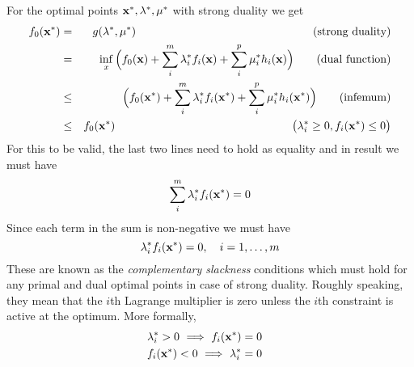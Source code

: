 For the optimal points $\mathbf{x}^*,\mathbf{\lambda}^*,\mathbf{\mu}^*$ with strong duality we get
\begin{eqnarray}
 f_0(\vc{x}^*) 
& = & g(\vc{\lambda}^*,\vc{\mu}^*) \text{\hskip 5.5cm (strong duality)} \nonumber \\
& = & \inf_x \Big( 
  f_0(\vc{x}) + \sum_i^m \lambda_i^* f_i(\vc{x}) + \sum_i^p \mu_i^* h_i(\vc{x})
\Big) \qquad \text{(dual function)} \nonumber \\
& \leq & \Big( 
  f_0(\vc{x}^*) + \sum_i^m \lambda_i^* f_i(\vc{x}^*) + \sum_i^p \mu_i^* h_i(\vc{x}^*)
\Big) \qquad \text{(infemum)} \\
& \leq & f_0(\vc{x}^*) \text{\hskip 5.5cm } \big( \lambda_i^* \geq 0,  f_i(\vc{x}^*) \leq 0 \big) \nonumber
\end{eqnarray}
For this to be valid, the last two lines need to hold as equality and in result we must have
\begin{equation}
 \sum_i^m \lambda_i^* f_i(\mathbf{x}^*) = 0
\end{equation}
Since each term in the sum is non-negative we must have
\begin{equation}\label{eq:ComplementarySlackness}\index{Complementary slackness}
 \lambda_i^* f_i(\vc{x}^*) = 0, \quad i=1,\ldots,m
\end{equation}
These are known as the \emph{complementary slackness} conditions which must hold for any primal and dual optimal points in case of strong duality.
Roughly speaking, they mean that the $i$th Lagrange multiplier is zero unless the $i$th constraint is active at the optimum. More formally,
\begin{eqnarray}
 & \lambda_i^* > 0 ~ \Longrightarrow ~ f_i(\mathbf{x}^*) = 0 & \nonumber \\
 & f_i(\mathbf{x}^*) < 0 ~ \Longrightarrow ~ \lambda_i^* = 0 &
\end{eqnarray}

